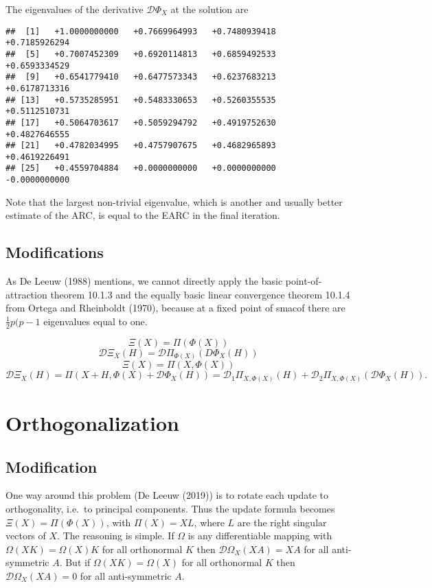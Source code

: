 \documentclass[
  12pt,
]{article}
\begin{document}
The eigenvalues of the derivative \(\mathcal{D}\Phi_X\) at the solution are

\begin{verbatim}
##  [1]   +1.0000000000   +0.7669964993   +0.7480939418   +0.7185926294
##  [5]   +0.7007452309   +0.6920114813   +0.6859492533   +0.6593334529
##  [9]   +0.6541779410   +0.6477573343   +0.6237683213   +0.6178713316
## [13]   +0.5735285951   +0.5483330653   +0.5260355535   +0.5112510731
## [17]   +0.5064703617   +0.5059294792   +0.4919752630   +0.4827646555
## [21]   +0.4782034995   +0.4757907675   +0.4682965893   +0.4619226491
## [25]   +0.4559704884   +0.0000000000   +0.0000000000   -0.0000000000
\end{verbatim}

Note that the largest non-trivial eigenvalue, which is another and usually better
estimate of the ARC, is equal to the EARC in the final iteration.

\subsection{Modifications}\label{modifications}

As De Leeuw (1988) mentions, we cannot directly apply the basic point-of-attraction theorem 10.1.3 and the equally basic linear convergence theorem 10.1.4 from Ortega and Rheinboldt (1970), because at a fixed point of smacof there are \(\frac12 p(p-1\) eigenvalues equal to one.

\[\Xi(X)=\Pi(\Phi(X))\]
\[
\mathcal{D}\Xi_X(H)=\mathcal{D}\Pi_{\Phi(X)}(D\Phi_X(H))
\]
\[
\Xi(X)=\Pi(X,\Phi(X))
\]
\[
\mathcal{D}\Xi_X(H)=\Pi(X+H,\Phi(X)+\mathcal{D}\Phi_X(H))=\mathcal{D}_1\Pi_{X,\Phi(X)}(H)+
\mathcal{D}_2\Pi_{X,\Phi(X)}(\mathcal{D}\Phi_X(H)).
\]

\section{Orthogonalization}\label{orthogonalization}

\subsection{Modification}\label{modification}

One way around this problem (De Leeuw (2019)) is to rotate each update to orthogonality,
i.e.~to principal components. Thus the update formula becomes \(\Xi(X)=\Pi(\Phi(X))\), with \(\Pi(X)=XL\), where \(L\) are the right singular vectors of \(X\). The reasoning is simple.
If \(\Omega\) is any differentiable mapping with \(\Omega(XK)=\Omega(X)K\) for all orthonormal
\(K\) then \(\mathcal{D}\Omega_X(XA)=XA\) for all anti-symmetric \(A\). But if
\(\Omega(XK)=\Omega(X)\) for all orthonormal \(K\) then \(\mathcal{D}\Omega_X(XA)=0\) for all
anti-symmetric \(A\).
\end{document}
